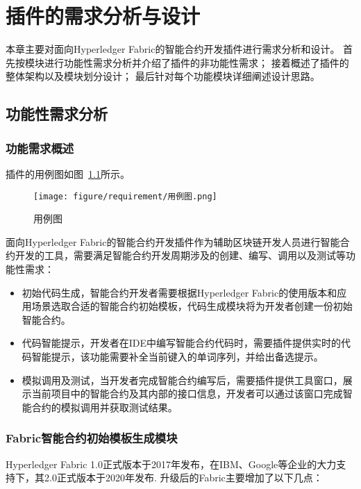 \chapter{插件的需求分析与设计}

本章主要对面向Hyperledger Fabric的智能合约开发插件进行需求分析和设计。
首先按模块进行功能性需求分析并介绍了插件的非功能性需求；
接着概述了插件的整体架构以及模块划分设计；
最后针对每个功能模块详细阐述设计思路。

\section{功能性需求分析}

\subsection{功能需求概述}

插件的用例图如图~\ref{fig:3.1}所示。

\begin{figure}[htb]
  \centering
  \texttt{[image: figure/requirement/用例图.png]}
  \caption{用例图}\label{fig:3.1}
\end{figure}

面向Hyperledger Fabric的智能合约开发插件作为辅助区块链开发人员进行智能合约开发的工具，需要满足智能合约开发周期涉及的创建、编写、调用以及测试等功能性需求：

\begin{itemize}
  \item 初始代码生成，智能合约开发者需要根据Hyperledger Fabric的使用版本和应用场景选取合适的智能合约初始模板，代码生成模块将为开发者创建一份初始智能合约。
  \item 代码智能提示，开发者在IDE中编写智能合约代码时，需要插件提供实时的代码智能提示，该功能需要补全当前键入的单词序列，并给出备选提示。
  \item 模拟调用及测试，当开发者完成智能合约编写后，需要插件提供工具窗口，展示当前项目中的智能合约及其内部的接口信息，开发者可以通过该窗口完成智能合约的模拟调用并获取测试结果。
\end{itemize}

\subsection{Fabric智能合约初始模板生成模块}

Hyperledger Fabric 1.0正式版本于2017年发布，在IBM、Google等企业的大力支持下，其2.0正式版本于2020年发布.
升级后的Fabric主要增加了以下几点：

